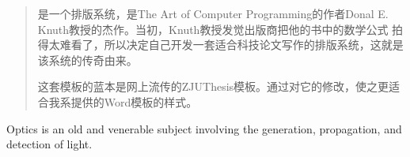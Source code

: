 \begin{abstract}
是一个排版系统，是The Art of Computer Programming的作者Donal E. Knuth教授的杰作。当初，Knuth教授发觉出版商把他的书中的数学公式
拍得太难看了，所以决定自己开发一套适合科技论文写作的排版系统，这就是该系统的传奇由来。

这套模板的蓝本是网上流传的ZJUThesis模板。通过对它的修改，使之更适合我系提供的Word模板的样式。

\end{abstract}


\begin{englishabstract}
Optics is an old and venerable subject involving the generation, propagation, and detection
of light.

\end{englishabstract}